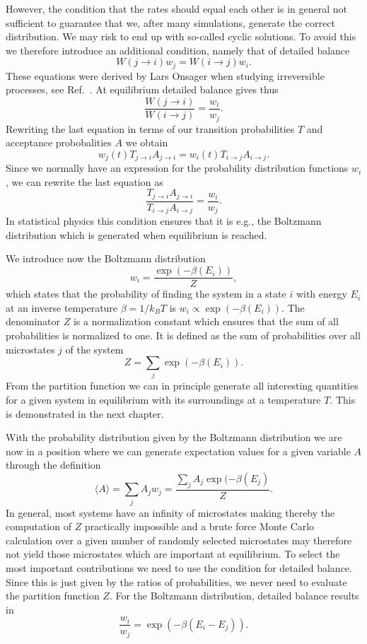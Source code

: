 However, the condition that the rates should equal each other is in general not sufficient
to guarantee that we, after many simulations, generate the correct distribution.
We may risk to end up with so-called cyclic solutions. To avoid this
we therefore introduce an additional condition, namely that of detailed balance 
       \[ W(j\rightarrow i)w_j= W(i\rightarrow j)w_i.  \]
These equations were derived by Lars Onsager when studying irreversible processes, see Ref.~\cite{onsager1931}.
At equilibrium detailed balance gives thus
       \[ \frac{W(j\rightarrow i)}{W(i\rightarrow j)}=\frac{w_i}{w_j}.  \]
Rewriting the last equation in terms of our transition probabilities $T$ and 
acceptance probobalities $A$ we obtain
\[ 
w_j(t)T_{j\rightarrow i}A_{j\rightarrow i}= w_i(t)T_{i\rightarrow j}A_{i\rightarrow j}.
\]
Since we normally have an expression 
for the probability distribution functions $w_i$,  we can rewrite the last equation as 
\[ 
\frac{T_{j\rightarrow i}A_{j\rightarrow i}}{T_{i\rightarrow j}A_{i\rightarrow j}}= \frac{w_i}{w_j}.
\]
In statistical physics this condition ensures that it is e.g., the 
Boltzmann distribution which is generated when equilibrium is reached.

We introduce  now the Boltzmann distribution 
\[
   w_i= \frac{\exp{(-\beta(E_i))}}{Z},
\]
which states that the probability of finding the system in a state $i$ with energy $E_i$ 
at an inverse temperature $\beta = 1/k_BT$ is $w_i\propto \exp{(-\beta(E_i))}$.
The denominator $Z$ is a normalization constant which ensures that the sum of all
probabilities is normalized to one. It is defined as the sum of probabilities over all microstates
$j$ of the system
\[
   Z=\sum_j \exp{(-\beta(E_i))}.
\]
From the partition function we can in principle generate all interesting quantities
for a given system in equilibrium with its surroundings at a temperature $T$. This is
demonstrated in the next chapter.

With the probability distribution given by the Boltzmann distribution we are now in a position
where we can generate expectation values for a given variable $A$ through the
definition
\[
   \langle A \rangle = \sum_jA_jw_j=
    \frac{\sum_jA_j\exp{(-\beta(E_j)}}{Z}.
\]
In general, most systems have an infinity of microstates making thereby the computation
of $Z$ practically impossible and 
a brute force Monte Carlo calculation over a given number of randomly selected microstates
may therefore not yield those microstates which are important 
at equilibrium. 
To select the most important contributions we need to  
use the condition for detailed balance. Since this is just given by the ratios of probabilities,
we never need to evaluate the partition function $Z$.
For the 
Boltzmann distribution, detailed balance results in
       \[ \frac{w_i}{w_j}= \exp{(-\beta(E_i-E_j))}. \]

